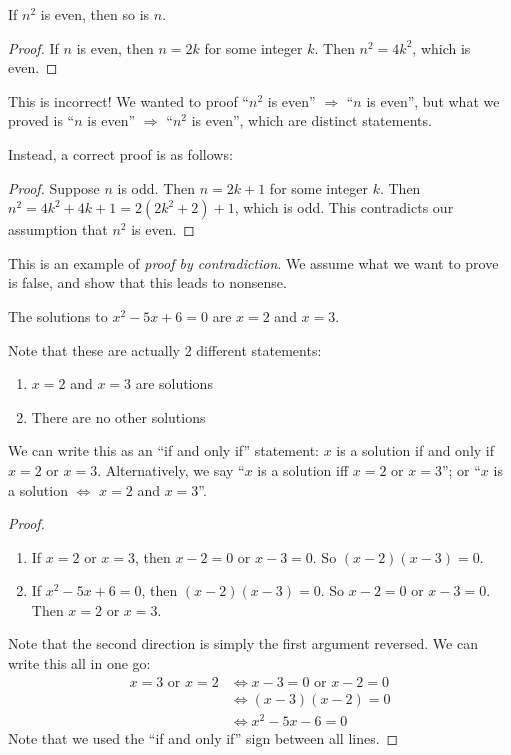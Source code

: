 \documentclass[a4paper]{article}
\begin{document}
\begin{prop}
  If $n^2$ is even, then so is $n$.
\end{prop}

\begin{proof}
  If $n$ is even, then $n = 2k$ for some integer $k$. Then $n^2 = 4k^2$, which is even.
\end{proof}
This is incorrect! We wanted to proof ``$n^2$ is even'' $\Rightarrow $ ``$n$ is even'', but what we proved is ``$n$ is even'' $\Rightarrow$ ``$n^2$ is even'', which are distinct statements.

Instead, a correct proof is as follows:

\begin{proof}
  Suppose $n$ is odd. Then $n = 2k + 1$ for some integer $k$. Then $n^2 = 4k^2 + 4k + 1 = 2(2k^2 + 2) + 1$, which is odd. This contradicts our assumption that $n^2$ is even.
\end{proof}
This is an example of \emph{proof by contradiction}. We assume what we want to prove is false, and show that this leads to nonsense.

\begin{prop}
  The solutions to $x^2 - 5x + 6 = 0$ are $x = 2$ and $x = 3$.
\end{prop}

Note that these are actually 2 different statements:
\begin{enumerate}
  \item $x = 2$ and $x = 3$ are solutions
  \item There are no other solutions
\end{enumerate}
We can write this as an ``if and only if'' statement: $x$ is a solution if and only if $x = 2$ or $x = 3$. Alternatively, we say ``$x$ is a solution iff $x = 2$ or $x = 3$''; or ``$x$ is a solution $\Leftrightarrow$ $x = 2$ and $x = 3$''.

\begin{proof}\leavevmode
  \begin{enumerate}
    \item If $x = 2$ or $x = 3$, then $x - 2 = 0$ or $x - 3 = 0$. So $(x - 2)(x - 3) = 0$.
    \item If $x^2 - 5x + 6 = 0$, then $(x - 2)(x - 3) = 0$. So $x - 2 = 0$ or $x - 3 = 0$. Then $x = 2$ or $x = 3$.
  \end{enumerate}
  Note that the second direction is simply the first argument reversed. We can write this all in one go:
  \begin{align*}
    x = 3 \text{ or }x = 2&\Leftrightarrow x - 3 = 0\text{ or }x - 2 = 0\\
    &\Leftrightarrow (x - 3)(x - 2) = 0\\
    &\Leftrightarrow x^2 - 5x - 6 = 0
  \end{align*}
  Note that we used the ``if and only if'' sign between all lines.
\end{proof}
\end{document}
